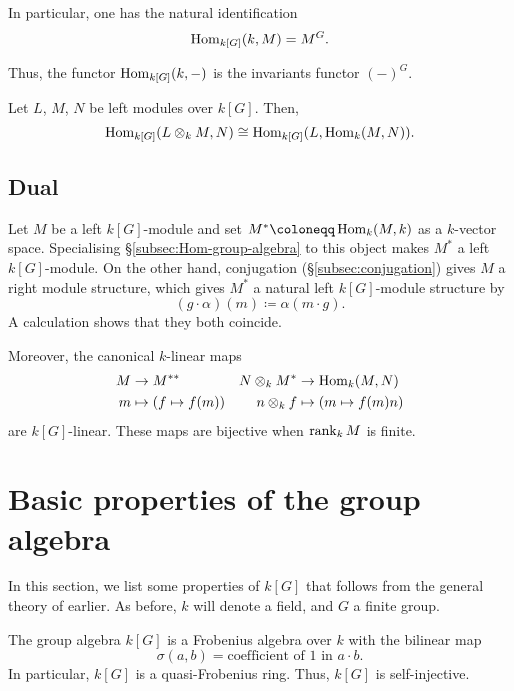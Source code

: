 \documentclass[12pt]{article}
\begin{document}
In particular, one has the natural identification
\begin{equation*} 
	\operatorname{Hom}_{k[G]}(k, M) = M^{G}.
\end{equation*}

Thus, the functor $\operatorname{Hom}_{k[G]}(k, -)$ is the invariants functor $(-)^{G}$.

\begin{thm}
	Let $L$, $M$, $N$ be left modules over $k[G]$. Then,
	\begin{equation*} 
		\operatorname{Hom}_{k[G]}(L \otimes_{k} M, N) \cong \operatorname{Hom}_{k[G]}(L, \operatorname{Hom}_{k}(M, N)).
	\end{equation*}
\end{thm}

\subsection{Dual}

Let $M$ be a left $k[G]$-module and set $M^{\ast} \coloneqq \Hom_{k}(M, k)$ as a $k$-vector space. 
Specialising \S\ref{subsec:Hom-group-algebra} to this object makes $M^{\ast}$ a left $k[G]$-module. 
On the other hand, conjugation (\S\ref{subsec:conjugation}) gives $M$ a right module structure, which gives $M^{\ast}$ a natural left $k[G]$-module structure by
\begin{equation*} 
	(g \cdot \alpha)(m) \coloneqq \alpha(m \cdot g).
\end{equation*}
A calculation shows that they both coincide.

Moreover, the canonical $k$-linear maps
\begin{align*} 
	M &\to M^{\ast \ast} & N \otimes_{k} M^{\ast} & \to \operatorname{Hom}_{k}(M, N) \\
	m &\mapsto (f \mapsto f(m)) & n \otimes_{k} f & \mapsto (m \mapsto f(m)n)
\end{align*}
are $k[G]$-linear. 
These maps are bijective when $\operatorname{rank}_{k} M$ is finite.

\section{Basic properties of the group algebra}

In this section, we list some properties of $k[G]$ that follows from the general theory of earlier. 
As before, $k$ will denote a field, and $G$ a finite group.

\begin{thm}
	The group algebra $k[G]$ is a Frobenius algebra over $k$ with the bilinear map
	\begin{equation*} 
		\sigma(a, b) = \text{coefficient of $1$ in $a \cdot b$}.
	\end{equation*}
	In particular, $k[G]$ is a quasi-Frobenius ring. 
	Thus, $k[G]$ is self-injective.
\end{thm}
\end{document}
